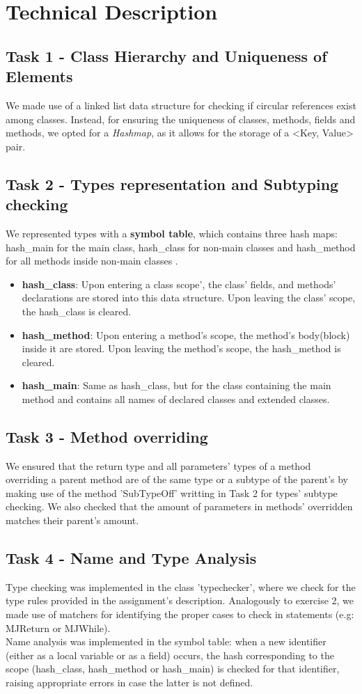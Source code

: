 \documentclass[paper=a4, fontsize=11pt]{scrartcl}
\numberwithin{equation}{section}		%
\numberwithin{figure}{section}			%
\numberwithin{table}{section}				%
\begin{document}
\section*{Technical Description}

\subsection*{Task 1 - Class Hierarchy and Uniqueness of Elements}
We made use of a linked list data structure for checking if circular references exist among classes. Instead, for ensuring the uniqueness of classes, methods, fields and methods, we opted for a \textit{Hashmap}, as it allows for the storage of a <Key, Value> pair. 
\subsection*{Task 2 - Types representation and Subtyping checking}
We represented types with a \textbf{symbol table}, which contains three hash maps: hash\_main for the main class, hash\_class for non-main classes and hash\_method for all methods inside non-main classes \cite{California}.\\
\begin{itemize}
	\item \textbf{hash\_class}: Upon entering a class scope', the class' fields, and methods' declarations are stored into this data structure. Upon leaving the class' scope, the hash\_class is cleared.
	\item \textbf{hash\_method}: Upon entering a method's scope, the method's body(block) inside it are stored. Upon leaving the method's scope, the hash\_method is cleared.
	\item \textbf{hash\_main}: Same as hash\_class, but for the class containing the main method and contains all names of declared classes and extended classes. 
\end{itemize}

\subsection*{Task 3 - Method overriding}
We ensured that the return type and all parameters' types of a method overriding a parent method are of the same type or a subtype of the parent's by making use of the method 'SubTypeOff' writting in Task 2 for types' subtype checking. We also checked that the amount of parameters in methods' overridden matches their parent's amount. 
\subsection*{Task 4 - Name and Type Analysis}
Type checking was implemented in the class 'typechecker', where we check for the type rules provided in the assignment's description. Analogously to exercise 2, we made use of matchers for identifying the proper cases to check in statements (e.g: MJReturn or MJWhile). \\
Name analysis was implemented in the symbol table: when a new identifier (either as a local variable or as a field) occurs, the hash corresponding to the scope (hash\_class, hash\_method or hash\_main) is checked for that identifier, raising appropriate errors in case the latter is not defined. 
\end{document}
